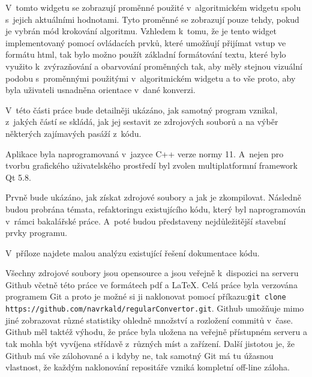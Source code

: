 

V~tomto widgetu se zobrazují proměnné použité v~algoritmickém widgetu spolu s~jejich  aktuálními hodnotami. Tyto proměnné se zobrazují pouze tehdy, pokud je vybrán mód krokování algoritmu. Vzhledem k~tomu, že je tento widget implementovaný pomocí ovládacích prvků, které umožňují přijímat vstup ve formátu html, tak bylo možno použít základní formátování textu, které bylo využito k~zvýrazňování a obarvování proměnných tak, aby měly stejnou vizuální podobu s~proměnnými použitými v~algoritmickém widgetu a to vše proto, aby byla uživateli usnadněna orientace v~dané konverzi.


V~této části práce bude detailněji ukázáno, jak samotný program vznikal, z~jakých částí se skládá, jak jej sestavit ze zdrojových souborů a na výběr některých zajímavých pasáží z~kódu.

Aplikace byla naprogramovaná v~jazyce C++ verze normy 11. A~nejen pro tvorbu grafického uživatelského prostředí byl zvolen multiplatformní framework Qt 5.8.

Prvně bude ukázáno, jak získat zdrojové soubory a jak je zkompilovat. Následně budou probrána témata, refaktoringu existujícího kódu, který byl naprogramován v~rámci bakalářské práce. A~poté budou představeny nejdůležitější stavební prvky programu.

V~příloze najdete malou analýzu existující řešení dokumentace kódu.


Všechny zdrojové soubory jsou opensource a jsou veřejně k~dispozici na serveru Github včetně této práce ve formátech pdf a \LaTeX. Celá práce byla verzována programem Git a proto je možné si ji naklonovat pomocí příkazu:\newline \texttt{git clone https://github.com/navrkald/regularConvertor.git}. Github umožňuje mimo jiné zobrazovat různé statistiky ohledně množství a rozložení commitů v~čase. Github měl taktéž výhodu, že práce byla uložena na veřejně přístupném serveru a tak mohla být vyvíjena střídavě z~různých míst a zařízení. Další jistotou je, že Github má vše zálohované a i kdyby ne, tak samotný Git má tu úžasnou vlastnost, že každým naklonování repositáře vzniká kompletní off-line záloha.

